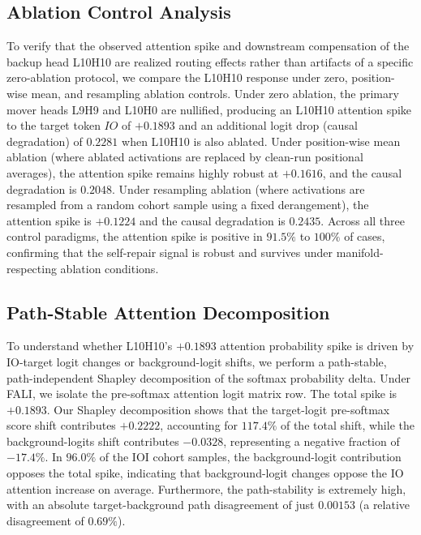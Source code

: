 \documentclass[12pt,a4paper]{article}
\begin{document}
\subsection{Ablation Control Analysis}
To verify that the observed attention spike and downstream compensation of the backup head L10H10 are realized routing effects rather than artifacts of a specific zero-ablation protocol, we compare the L10H10 response under zero, position-wise mean, and resampling ablation controls. Under zero ablation, the primary mover heads L9H9 and L10H0 are nullified, producing an L10H10 attention spike to the target token $IO$ of $+0.1893$ and an additional logit drop (causal degradation) of $0.2281$ when L10H10 is also ablated. Under position-wise mean ablation (where ablated activations are replaced by clean-run positional averages), the attention spike remains highly robust at $+0.1616$, and the causal degradation is $0.2048$. Under resampling ablation (where activations are resampled from a random cohort sample using a fixed derangement), the attention spike is $+0.1224$ and the causal degradation is $0.2435$. Across all three control paradigms, the attention spike is positive in $91.5\%$ to $100\%$ of cases, confirming that the self-repair signal is robust and survives under manifold-respecting ablation conditions.

\subsection{Path-Stable Attention Decomposition}
To understand whether L10H10's $+0.1893$ attention probability spike is driven by IO-target logit changes or background-logit shifts, we perform a path-stable, path-independent Shapley decomposition of the softmax probability delta. Under FALI, we isolate the pre-softmax attention logit matrix row. The total spike is $+0.1893$. Our Shapley decomposition shows that the target-logit pre-softmax score shift contributes $+0.2222$, accounting for $117.4\%$ of the total shift, while the background-logits shift contributes $-0.0328$, representing a negative fraction of $-17.4\%$. In $96.0\%$ of the IOI cohort samples, the background-logit contribution opposes the total spike, indicating that background-logit changes oppose the IO attention increase on average. Furthermore, the path-stability is extremely high, with an absolute target-background path disagreement of just $0.00153$ (a relative disagreement of $0.69\%$).
\end{document}
